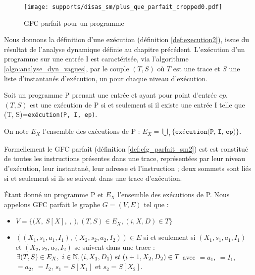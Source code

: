\begin{figure}[h]
\begin{center}
  \texttt{[image: supports/disas\_sm/plus\_que\_parfait\_cropped0.pdf]}
\end{center}
\caption{GFC parfait pour un programme \sm}
\label{fig:sm_cfg_parfait_sm}
\end{figure}

Nous donnons la définition d'une exécution (définition \ref{def:execution2}), issue du résultat de l'analyse dynamique définie au chapitre précédent. L'exécution d'un programme sur une entrée I est caractérisée, via l'algorithme \ref{algo:analyse_dyn_vagues}, par le couple $(T, S)$ où $T$ est une trace et $S$ une liste d'instantanés d'exécution, un pour chaque niveau d'exécution.

\begin{defi}
 Soit un programme P prenant une entrée et ayant pour point d'entrée $ep$.
 $(T, S)$ est une exécution de P si et seulement si il existe une entrée I telle que (T, S)=\texttt{exécution(P, I, ep)}.

 On note $E_X$ l'ensemble des exécutions de P : $E_X=\bigcup_I\{\texttt{exécution(P, I, ep)}\}$.
\label{def:execution2}
\end{defi}


Formellement le GFC parfait (définition \ref{def:cfg_parfait_sm2}) est est constitué de toutes les instructions présentes dans une trace, représentées par leur niveau d'exécution, leur instantané, leur adresse et l'instruction ; deux sommets sont liés si et seulement si ils se suivent dans une trace d'exécution.

\begin{defi}
 Étant donné un programme P \sm et $E_X$ l'ensemble des exécutions de P.
 Nous appelons GFC parfait le graphe $G=(V, E)$ tel que :
 \begin{itemize}
  \item $V=\{(X,\ S[X],\ $$,\ $$), (T, S)\in E_X, (i, X, D)\in T\}$%
  \item $((X_1, s_1, a_1, I_1), (X_2, s_2, a_2, I_2))\in E$ si et seulement si $(X_1, s_1, a_1,
I_1)$ et $(X_2, s_2, a_2, I_2)$ se suivent dans une trace : $\exists (T, S)\in
E_X,\ i\in \mathbb N, (i, X_1, D_1)\ et\ (i+1, X_2, D_2)\in T$ avec $=a_1,\ $$=I_1,$~$=a_2,\ $$=I_2$, $s_1=S[X_1]$ et $s_2=S[X_2]$.
 \end{itemize}
\label{def:cfg_parfait_sm2}
\end{defi}

